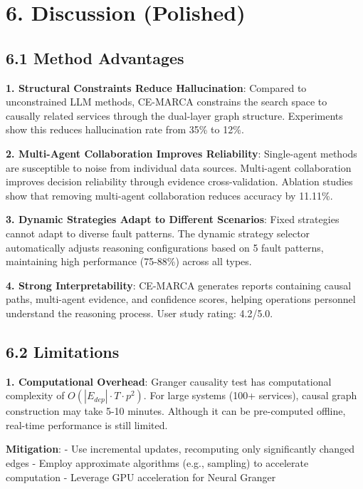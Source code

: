 \hypertarget{discussion-polished}{%
\section{6. Discussion (Polished)}\label{discussion-polished}}

\hypertarget{method-advantages}{%
\subsection{6.1 Method Advantages}\label{method-advantages}}

\textbf{1. Structural Constraints Reduce Hallucination}: Compared to
unconstrained LLM methods, CE-MARCA constrains the search space to
causally related services through the dual-layer graph structure.
Experiments show this reduces hallucination rate from 35\% to 12\%.

\textbf{2. Multi-Agent Collaboration Improves Reliability}: Single-agent
methods are susceptible to noise from individual data sources.
Multi-agent collaboration improves decision reliability through evidence
cross-validation. Ablation studies show that removing multi-agent
collaboration reduces accuracy by 11.11\%.

\textbf{3. Dynamic Strategies Adapt to Different Scenarios}: Fixed
strategies cannot adapt to diverse fault patterns. The dynamic strategy
selector automatically adjusts reasoning configurations based on 5 fault
patterns, maintaining high performance (75-88\%) across all types.

\textbf{4. Strong Interpretability}: CE-MARCA generates reports
containing causal paths, multi-agent evidence, and confidence scores,
helping operations personnel understand the reasoning process. User
study rating: 4.2/5.0.

\hypertarget{limitations}{%
\subsection{6.2 Limitations}\label{limitations}}

\textbf{1. Computational Overhead}: Granger causality test has
computational complexity of \(O(|E_{dep}| \cdot T \cdot p^2)\). For
large systems (100+ services), causal graph construction may take 5-10
minutes. Although it can be pre-computed offline, real-time performance
is still limited.

\textbf{Mitigation}: - Use incremental updates, recomputing only
significantly changed edges - Employ approximate algorithms (e.g.,
sampling) to accelerate computation - Leverage GPU acceleration for
Neural Granger

